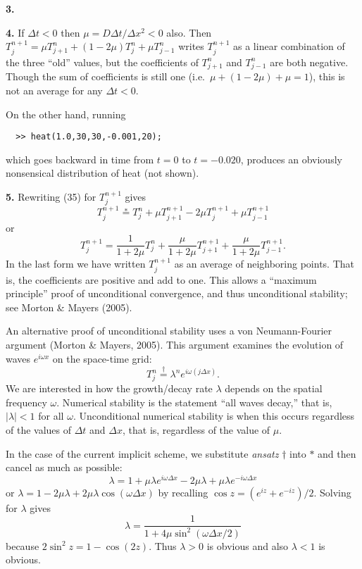 \documentclass[10pt]{amsart}
\newcommand{\mfile}[1]{
\begin{quote}
\bigskip
\VerbatimInput[frame=single,label=\fbox{\normalsize \textsl{\,#1\,}},fontfamily=courier,fontsize=\footnotesize]{#1}
\end{quote}
}
\newcommand{\prob}[1]{\bigskip\noindent\large\textbf{#1.}\normalsize }
\begin{document}
\prob{3}

\mfile{heatwithloops.m}

\prob{4}  If $\Delta t < 0$ then $\mu = D \Delta t / \Delta x^2 < 0$ also.  Then $T_j^{n+1} = \mu T_{j+1}^n + (1 - 2 \mu) T_j^n + \mu T_{j-1}^n$ writes $T_j^{n+1}$ as a linear combination of the three ``old'' values, but the coefficients of $T_{j+1}^n$ and $T_{j-1}^n$ are both negative.  Though the sum of coefficients is still one (i.e.~$\mu + (1-2\mu) + \mu = 1$), this is not an average for any $\Delta t < 0$.

On the other hand, running
\begin{verbatim}
  >> heat(1.0,30,30,-0.001,20);
\end{verbatim}
which goes backward in time from $t=0$ to $t=-0.020$, produces an obviously nonsensical distribution of heat (not shown).

\prob{5}  Rewriting (35) for $T_j^{n+1}$ gives
    $$T_j^{n+1} \stackrel{\ast}{=} T_j^n + \mu T_{j+1}^{n+1} - 2 \mu T_j^{n+1} + \mu T_{j-1}^{n+1}$$
or
    $$T_j^{n+1} = \frac{1}{1 + 2\mu} T_j^n + \frac{\mu}{1 + 2\mu} T_{j+1}^{n+1} + \frac{\mu}{1 + 2\mu} T_{j-1}^{n+1}.$$
In the last form we have written $T_j^{n+1}$ as an average of neighboring points.  That is, the coefficients are positive and add to one.  This allows a ``maximum principle'' proof of unconditional convergence, and thus unconditional stability; see  Morton \& Mayers (2005).

An alternative proof of unconditional stability uses a von Neumann-Fourier argument  (Morton \& Mayers, 2005).  This argument examines the evolution of waves $e^{i\omega x}$ on the space-time grid:
    $$T_j^n \stackrel{\dagger}{=} \lambda^n e^{i\omega (j\Delta x)}.$$
We are interested in how the growth/decay rate $\lambda$ depends on the spatial frequency $\omega$.  Numerical stability is the statement ``all waves decay,'' that is, $|\lambda|<1$ for all $\omega$.  Unconditional numerical stability is when this occurs regardless of the values of $\Delta t$ and $\Delta x$, that is, regardless of the value of $\mu$.

In the case of the current implicit scheme, we substitute \emph{ansatz} $\dagger$ into $\ast$ and then cancel as much as possible:
    $$\lambda = 1 + \mu \lambda e^{i\omega\Delta x} - 2 \mu \lambda + \mu \lambda e^{-i\omega\Delta x}$$
or $\lambda = 1 - 2 \mu \lambda + 2 \mu \lambda \cos(\omega\Delta x)$ by recalling $\cos z = (e^{iz} + e^{-iz}) / 2$.  Solving for $\lambda$ gives
    $$\lambda = \frac{1}{1 + 4 \mu \sin^2(\omega\Delta x/2)}$$
because $2 \sin^2 z = 1-\cos(2z)$.  Thus $\lambda > 0$ is obvious and also $\lambda < 1$ is obvious.
\end{document}
